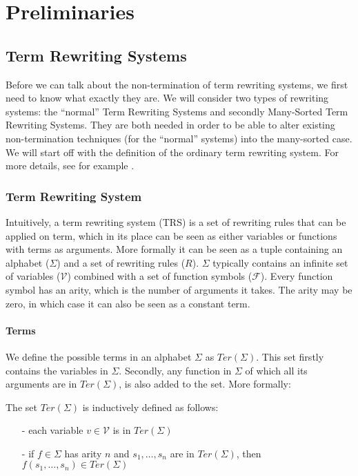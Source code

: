 \chapter{Preliminaries}\label{preliminaries}
\section{Term Rewriting Systems}\label{sec:trs}
Before we can talk about the non-termination of term rewriting systems, we first need to know what exactly they are. We will consider two types of rewriting systems: the ``normal'' Term Rewriting Systems and secondly Many-Sorted Term Rewriting Systems. They are both needed in order to be able to alter existing non-termination techniques (for the ``normal'' systems) into the many-sorted case. We will start off with the definition of the ordinary term rewriting system. For more details, see for example \cite{Klop:1993:TRS:162552.162559}.
\subsection{Term Rewriting System}
Intuitively, a term rewriting system (TRS) is a set of rewriting rules that can be applied on term, which in its place can be seen as either variables or functions with terms as arguments. More formally it can be seen as a tuple containing an alphabet ($\Sigma$) and a set of rewriting rules ($R$). $\Sigma$ typically contains an infinite set of variables ($\mathcal{V}$) combined with a set of function symbols ($\mathcal{F}$). Every function symbol has an arity, which is the number of arguments it takes. The arity may be zero, in which case it can also be seen as a constant term.  

\subsubsection*{Terms}
We define the possible terms in an alphabet $\Sigma$ as $\textit{Ter}\left(\Sigma\right)$. This set firstly contains the variables in $\Sigma$. Secondly, any function in $\Sigma$ of which all its arguments are in $\textit{Ter}\left(\Sigma\right)$, is also added to the set. More formally: 
\begin{definition}\label{def:untypedterms}
The set $\textit{Ter}\left(\Sigma\right)$ is inductively defined as follows:
\begin{itemize}
    \itemsep -0.5em
    \item[-] each variable $v \in \mathcal{V}$ is in $\textit{Ter}\left(\Sigma\right)$
    \item[-] if $f \in \Sigma$ has arity $n$ and $s_1, \dots, s_n$ are in $\textit{Ter}\left(\Sigma\right)$, then $f(s_1, \dots, s_n) \in \textit{Ter}(\Sigma)$
\end{itemize}
\end{definition}

